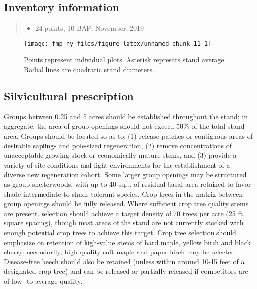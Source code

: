 \documentclass[]{tufte-handout}
\providecommand{\tightlist}{%
  \setlength{\itemsep}{0pt}\setlength{\parskip}{0pt}}
\begin{document}
\subsection{Inventory information}\label{inventory-information-1}

\begin{quote}
\begin{itemize}
\tightlist
\item
  24 points, 10 BAF, November, 2019
\end{itemize}
\end{quote}

\begin{figure}
\texttt{[image: fmp-ny\_files/figure-latex/unnamed-chunk-11-1]} \caption[Points represent individual plots]{Points represent individual plots. Asterisk represnts stand average. Radial lines are quadratic stand diameters.}\label{fig:unnamed-chunk-11}
\end{figure}

\subsection{Silvicultural
prescription}\label{silvicultural-prescription-1}

Groups between 0.25 and 5 acres should be established throughout the
stand; in aggregate, the area of group openings should not exceed 50\%
of the total stand area. Groups should be located so as to: (1) release
patches or contiguous areas of desirable sapling- and pole-sized
regeneration, (2) remove concentrations of unacceptable growing stock or
economically mature stems, and (3) provide a variety of site conditions
and light environments for the establishment of a diverse new
regeneration cohort. Some larger group openings may be structured as
group shelterwoods, with up to 40 sqft. of residual basal area retained
to favor shade-intermediate to shade-tolerant species. Crop trees in the
matrix between group openings should be fully released. Where sufficient
crop tree quality stems are present, selection should achieve a target
density of 70 trees per acre (25 ft. square spacing), though most areas
of the stand are not currently stocked with enough potential crop trees
to achieve this target. Crop tree selection should emphasize on
retention of high-value stems of hard maple, yellow birch and black
cherry; secondarily, high-quality soft maple and paper birch may be
selected. Disease-free beech should also be retained (unless within
around 10-15 feet of a designated crop tree) and can be released or
partially released if competitors are of low- to average-quality.

\newpage
\end{document}
